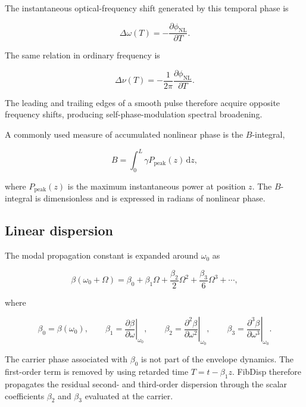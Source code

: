 \documentclass[11pt,a4paper]{article}
\newcommand{\dd}{\mathrm{d}}
\begin{document}
The instantaneous optical-frequency shift generated by this temporal phase is

\begin{equation}
\boxed{
\Delta\omega(T)
=-\frac{\partial\phi_{\mathrm{NL}}}{\partial T}.
}
\end{equation}

The same relation in ordinary frequency is

\begin{equation}
\boxed{
\Delta\nu(T)
=-\frac{1}{2\pi}
\frac{\partial\phi_{\mathrm{NL}}}{\partial T}.
}
\end{equation}

The leading and trailing edges of a smooth pulse therefore acquire opposite
frequency shifts, producing self-phase-modulation spectral broadening.

A commonly used measure of accumulated nonlinear phase is the $B$-integral,

\begin{equation}
 B=\int_0^L\gamma P_{\mathrm{peak}}(z)\,\dd z,
\end{equation}

where $P_{\mathrm{peak}}(z)$ is the maximum instantaneous power at position $z$.
The $B$-integral is dimensionless and is expressed in radians of nonlinear phase.

\subsection{Linear dispersion}

The modal propagation constant is expanded around $\omega_0$ as

\begin{equation}
\beta(\omega_0+\Omega)
=
\beta_0+\beta_1\Omega
+\frac{\beta_2}{2}\Omega^2
+\frac{\beta_3}{6}\Omega^3+\cdots,
\end{equation}

where

\begin{equation}
\beta_0=\beta(\omega_0),
\qquad
\beta_1=\left.\frac{\partial\beta}{\partial\omega}\right|_{\omega_0},
\qquad
\beta_2=\left.\frac{\partial^2\beta}{\partial\omega^2}\right|_{\omega_0},
\qquad
\beta_3=\left.\frac{\partial^3\beta}{\partial\omega^3}\right|_{\omega_0}.
\end{equation}

The carrier phase associated with $\beta_0$ is not part of the envelope dynamics.
The first-order term is removed by using retarded time $T=t-\beta_1z$.
FibDisp therefore propagates the residual second- and third-order dispersion
through the scalar coefficients $\beta_2$ and $\beta_3$ evaluated at the carrier.
\end{document}

